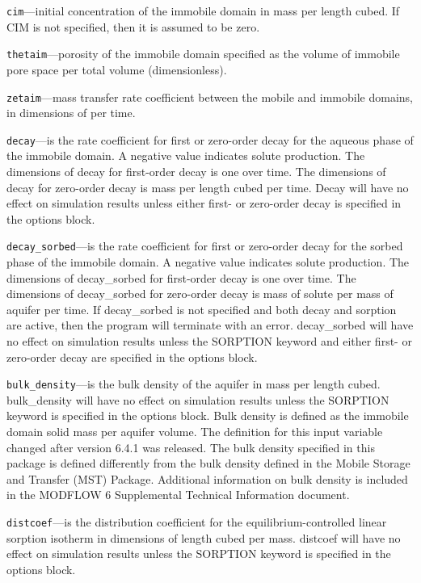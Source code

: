 \begin{description}
\item \texttt{cim}---initial concentration of the immobile domain in mass per length cubed.  If CIM is not specified, then it is assumed to be zero.

\item \texttt{thetaim}---porosity of the immobile domain specified as the volume of immobile pore space per total volume (dimensionless).

\item \texttt{zetaim}---mass transfer rate coefficient between the mobile and immobile domains, in dimensions of per time.

\item \texttt{decay}---is the rate coefficient for first or zero-order decay for the aqueous phase of the immobile domain.  A negative value indicates solute production.  The dimensions of decay for first-order decay is one over time.  The dimensions of decay for zero-order decay is mass per length cubed per time.  Decay will have no effect on simulation results unless either first- or zero-order decay is specified in the options block.

\item \texttt{decay\_sorbed}---is the rate coefficient for first or zero-order decay for the sorbed phase of the immobile domain.  A negative value indicates solute production.  The dimensions of decay\_sorbed for first-order decay is one over time.  The dimensions of decay\_sorbed for zero-order decay is mass of solute per mass of aquifer per time.  If decay\_sorbed is not specified and both decay and sorption are active, then the program will terminate with an error.  decay\_sorbed will have no effect on simulation results unless the SORPTION keyword and either first- or zero-order decay are specified in the options block.

\item \texttt{bulk\_density}---is the bulk density of the aquifer in mass per length cubed.  bulk\_density will have no effect on simulation results unless the SORPTION keyword is specified in the options block.  Bulk density is defined as the immobile domain solid mass per aquifer volume. The definition for this input variable changed after version 6.4.1 was released.  The bulk density specified in this package is defined differently from the bulk density defined in the Mobile Storage and Transfer (MST) Package. Additional information on bulk density is included in the MODFLOW 6 Supplemental Technical Information document.

\item \texttt{distcoef}---is the distribution coefficient for the equilibrium-controlled linear sorption isotherm in dimensions of length cubed per mass.  distcoef will have no effect on simulation results unless the SORPTION keyword is specified in the options block.

\end{description}

